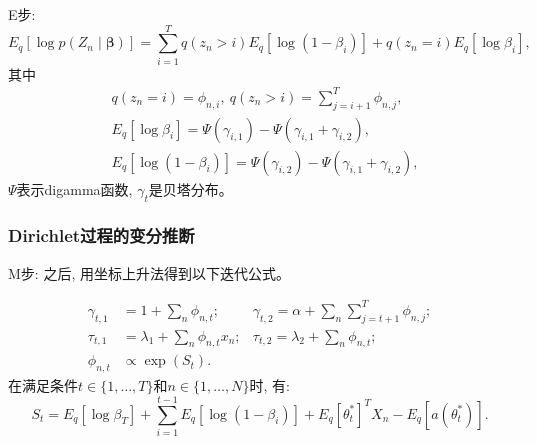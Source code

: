 \documentclass[10pt]{beamer}
\begin{document}
{\begin{frame}[c]
    E步: 
    \begin{equation}
        \label{equ:qwiueiqwhe}
        E_{q}\left[\log p\left(Z_{n} \mid \boldsymbol{\beta}\right)\right]=\sum_{i=1}^{T} q\left(z_{n}>i\right) E_{q}\left[\log \left(1-\beta_{i}\right)\right]+q\left(z_{n}=i\right) E_{q}\left[\log \beta_{i}\right], 
    \end{equation}
    其中
    {\small
    \begin{equation*}
        \begin{aligned}
            &q\left(z_{n}=i\right) =\phi_{n, i}, \ q\left(z_{n}>i\right) =\sum_{j=i+1}^{T} \phi_{n, j}, \\
            &E_{q}\left[\log \beta_{i}\right] =\Psi\left(\gamma_{i, 1}\right)-\Psi\left(\gamma_{i, 1}+\gamma_{i, 2}\right), \\
            &E_{q}\left[\log \left(1-\beta_{i}\right)\right] =\Psi\left(\gamma_{i, 2}\right)-\Psi\left(\gamma_{i, 1}+\gamma_{i, 2}\right), 
        \end{aligned}
    \end{equation*}
    }
    $\Psi$表示digamma函数, $\gamma_{t}$是贝塔分布。
\end{frame}

\begin{frame}[c]
    \frametitle{Dirichlet过程的变分推断}
    
    M步: 之后, 用坐标上升法得到以下迭代公式。

    \begin{equation}
        \label{equ:asduaisdawqdh}
        \begin{aligned}
        \gamma_{t, 1} &=1+\sum_{n} \phi_{n, t};&
        \gamma_{t, 2} =\alpha+\sum_{n} \sum_{j=t+1}^{T} \phi_{n, j}; \\
        \tau_{t, 1} &=\lambda_{1}+\sum_{n} \phi_{n, t} x_{n};& 
        \tau_{t, 2} =\lambda_{2}+\sum_{n} \phi_{n, t}; \\
        \phi_{n, t} & \propto \exp \left(S_{t}\right). &
        \end{aligned}
    \end{equation}
    在满足条件$t \in\{1, \ldots, T\}$和$n \in\{1, \ldots, N\}$时, 有: 
    \begin{equation*}
        S_{t}=E_{q}\left[\log \beta_{T}\right]+\sum_{i=1}^{t-1} E_{q}\left[\log \left(1-\beta_{i}\right)\right]+E_{q}\left[\theta_{t}^{*}\right]^{T} X_{n}-E_{q}\left[a\left(\theta_{t}^{*}\right)\right]. 
    \end{equation*}
\end{frame}

}
\end{document}
